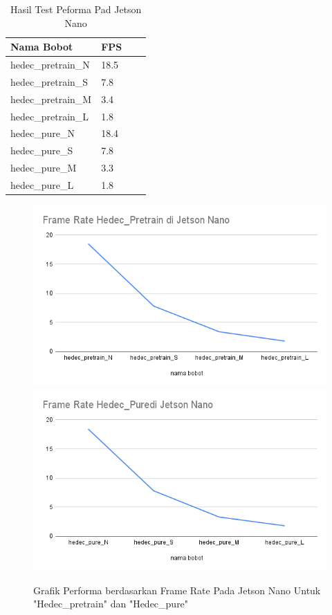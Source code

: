 \begin{longtable}{|l|l|l|l|} 
  \caption{Hasil Test Peforma Pad Jetson Nano}
  \label{tb:jetsonanoperformancetest}\\
  \hline
  \textbf{Nama Bobot} & \textbf{FPS}      \\ 
  \hline
  hedec\_pretrain\_N                             & 18.5          \\
  hedec\_pretrain\_S                             & 7.8           \\
  hedec\_pretrain\_M                           & 3.4           \\
  hedec\_pretrain\_L                            & 1.8           \\
  hedec\_pure\_N                              & 18.4          \\
  hedec\_pure\_S                              & 7.8           \\
  hedec\_pure\_M                              & 3.3           \\
  hedec\_pure\_L                                 & 1.8           \\
  \hline
\end{longtable}

\begin{figure} [h!]
  \centering
  \includegraphics[width=.45\textwidth]{gambar/performance_jetson/Frame Rate Hedec_Pretrain di Jetson Nano.png}
  \includegraphics[width=.45\textwidth]{gambar/performance_jetson/Frame Rate Hedec_Puredi Jetson Nano.png}
  \caption{Grafik Performa berdasarkan Frame Rate Pada Jetson Nano Untuk "Hedec\_pretrain" dan "Hedec\_pure"}
  \label{fig:graf_jetsonano}  
\end{figure}

\FloatBarrier


